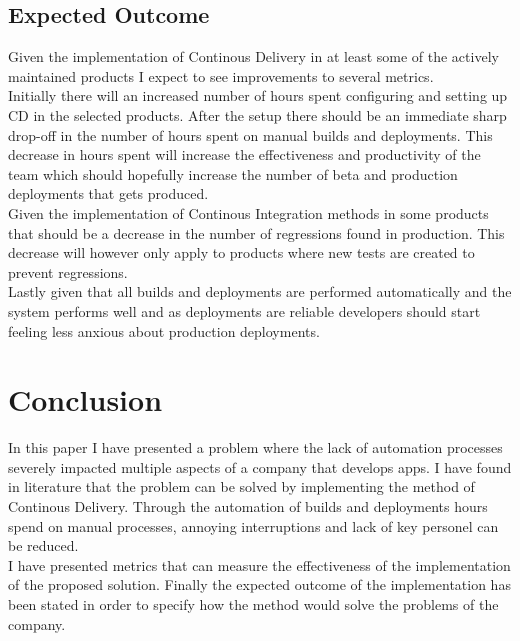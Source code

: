 \documentclass{ituthesis}
\begin{document}
\section{Expected Outcome}

Given the implementation of Continous Delivery in at least some of the actively maintained products I expect to see improvements to several metrics.\\

Initially there will an increased number of hours spent configuring and setting up CD in the selected products. After the setup there should be an immediate sharp drop-off in the number of hours spent on manual builds and deployments. This decrease in hours spent will increase the effectiveness and productivity of the team which should hopefully increase the number of beta and production deployments that gets produced.\\

Given the implementation of Continous Integration methods in some products that should be a decrease in the number of regressions found in production. This decrease will however only apply to products where new tests are created to prevent regressions.\\

Lastly given that all builds and deployments are performed automatically and the system performs well and as deployments are reliable developers should start feeling less anxious about production deployments.

\chapter{Conclusion}
\label{ch:conclusion}

In this paper I have presented a problem where the lack of automation processes severely impacted multiple aspects of a company that develops apps. I have found in literature that the problem can be solved by implementing the method of Continous Delivery. Through the automation of builds and deployments hours spend on manual processes, annoying interruptions and lack of key personel can be reduced.\\

I have presented metrics that can measure the effectiveness of the implementation of the proposed solution. Finally the expected outcome of the implementation has been stated in order to specify how the method would solve the problems of the company.

\clearpage

\nocite{Humble2010}
\nocite{Bellomo2014}
\nocite{beck2001agile}

\end{document}
